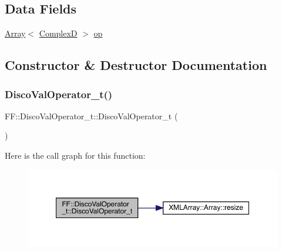 \subsection*{Data Fields}
\begin{DoxyCompactItemize}
\item 
\mbox{\hyperlink{classXMLArray_1_1Array}{Array}}$<$ \mbox{\hyperlink{group__defs_gaf38ee8c84f090ee0c3b76e7a384fb316}{ComplexD}} $>$ \mbox{\hyperlink{classFF_1_1DiscoValOperator__t_a1ed72a6f794e1427a944385c0d54d679}{op}}
\end{DoxyCompactItemize}


\subsection{Constructor \& Destructor Documentation}
\mbox{\label{classFF_1_1DiscoValOperator__t_a818e9637a1ac97359f1e611f1f524761}} 
\subsubsection{\texorpdfstring{DiscoValOperator\_t()}{DiscoValOperator\_t()}\hspace{0.1cm}{\footnotesize\ttfamily [1/3]}}
{\footnotesize\ttfamily F\+F\+::\+Disco\+Val\+Operator\+\_\+t\+::\+Disco\+Val\+Operator\+\_\+t (\begin{DoxyParamCaption}{ }\end{DoxyParamCaption})\hspace{0.3cm}{\ttfamily [inline]}}

Here is the call graph for this function\+:\nopagebreak
\begin{figure}[H]
\begin{center}
\leavevmode
\includegraphics[width=350pt]{d2/dbc/classFF_1_1DiscoValOperator__t_a818e9637a1ac97359f1e611f1f524761_cgraph}
\end{center}
\end{figure}
\mbox{\label{classFF_1_1DiscoValOperator__t_aff2684b99129c3fa09b915d69abeb421}} 
